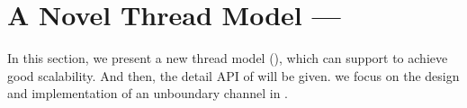 \section{A Novel Thread Model --- \myth}
\label{sec:design}
In this section, we present a new thread model (\myth), which can support \myds to achieve good scalability.
And then, the detail API of \myth will be given.
we focus on the design and implementation of an unboundary channel in \myth.


%
